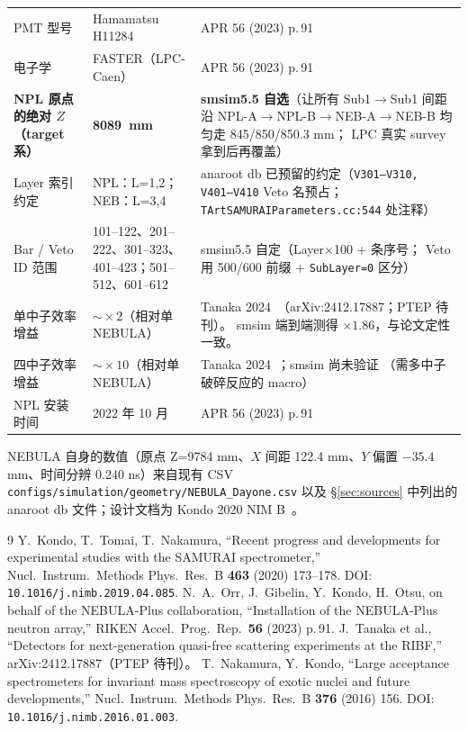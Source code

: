 \documentclass[a4paper,11pt]{ctexart}
\newcommand{\NEB}{NEBULA}
\newcommand{\NPL}{NEBULA-Plus}
\begin{document}
\begin{table}[h]
\begin{tabular}{p{4.4cm}lp{6.8cm}}
PMT 型号
  & Hamamatsu H11284
  & APR 56 (2023) p.\,91~\cite{aprApr2022}\\
电子学
  & FASTER（LPC-Caen）
  & APR 56 (2023) p.\,91~\cite{aprApr2022}\\
\midrule
\textbf{NPL 原点的绝对 $Z$（target 系）}
  & \textbf{\SI{8089}{mm}}
  & \textbf{smsim5.5 自选}（让所有 Sub1$\to$Sub1 间距沿
        NPL-A$\to$NPL-B$\to$NEB-A$\to$NEB-B 均匀走 845/850/850.3 mm；
        LPC 真实 survey 拿到后再覆盖）\\
Layer 索引约定
  & NPL：L=1,2；NEB：L=3,4
  & anaroot db 已预留的约定（\texttt{V301--V310, V401--V410}
        Veto 名预占；\texttt{TArtSAMURAIParameters.cc:544} 处注释）\\
Bar / Veto ID 范围
  & 101--122、201--222、301--323、401--423；501--512、601--612
  & smsim5.5 自定（Layer$\times$100 + 条序号；
        Veto 用 500/600 前缀 + \texttt{SubLayer=0} 区分）\\
单中子效率增益
  & $\sim\!\times 2$（相对单 \NEB{}）
  & Tanaka 2024~\cite{tanaka2024}（arXiv:2412.17887；PTEP 待刊）。
        smsim 端到端测得 $\times 1.86$，与论文定性一致。\\
四中子效率增益
  & $\sim\!\times 10$（相对单 \NEB{}）
  & Tanaka 2024~\cite{tanaka2024}；smsim 尚未验证
        （需多中子破碎反应的 macro）\\
NPL 安装时间
  & 2022 年 10 月
  & APR 56 (2023) p.\,91~\cite{aprApr2022}\\
\bottomrule
\end{tabular}
\end{table}

\NEB{} 自身的数值（原点 Z=9784 mm、$X$ 间距 122.4 mm、$Y$ 偏置
$-35.4$ mm、时间分辨 0.240 ns）来自现有 CSV
\texttt{configs/simulation/geometry/NEBULA\_Dayone.csv}
以及 \S\ref{sec:sources} 中列出的 anaroot db 文件；设计文档为
Kondo 2020 NIM B~\cite{kondo2020nim}。

\begin{thebibliography}{9}
 Y.~Kondo, T.~Tomai, T.~Nakamura,
``Recent progress and developments for experimental studies with the SAMURAI
spectrometer,'' Nucl.\ Instrum.\ Methods Phys.\ Res.\ B \textbf{463} (2020) 173--178.
DOI: \texttt{10.1016/j.nimb.2019.04.085}.
 N.~A.~Orr, J.~Gibelin, Y.~Kondo, H.~Otsu, on behalf of the
\NPL{} collaboration, ``Installation of the \NPL{} neutron array,'' RIKEN Accel.\
Prog.\ Rep.\ \textbf{56} (2023) p.\,91.
 J.~Tanaka et al., ``Detectors for next-generation
quasi-free scattering experiments at the RIBF,'' arXiv:2412.17887（PTEP 待刊）。
\bibitem{nakamura2016} T.~Nakamura, Y.~Kondo, ``Large acceptance spectrometers for
invariant mass spectroscopy of exotic nuclei and future developments,''
Nucl.\ Instrum.\ Methods Phys.\ Res.\ B \textbf{376} (2016) 156. DOI:
\texttt{10.1016/j.nimb.2016.01.003}.
\end{thebibliography}
\end{document}
